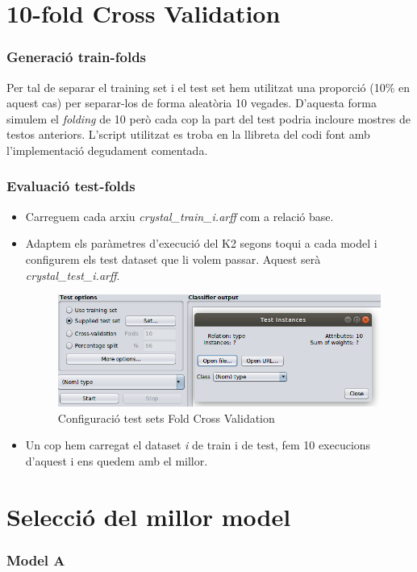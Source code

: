 \documentclass[11pt,a4paper]{article}
\begin{document}
\newpage

\part{10-fold Cross Validation}
\section{Generació train-folds}
Per tal de separar el training set i el test set hem utilitzat una proporció (10\% en aquest cas) per separar-los de forma aleatòria 10 vegades. D'aquesta forma simulem el \textit{folding} de 10 però cada cop la part del test podria incloure mostres de testos anteriors. L'script utilitzat es troba en la llibreta del codi font amb l'implementació degudament comentada.

\section{Evaluació test-folds}
\begin{itemize}
\item Carreguem cada arxiu \textit{crystal\_train\_i.arff} com a relació base.
\item Adaptem els paràmetres d'execució del K2 segons toqui a cada model i configurem els test dataset que li volem passar. Aquest serà \textit{crystal\_test\_i.arff}. 
\begin{figure}[hbtp]
\centering
\includegraphics[scale=0.6]{Figures/8.png}
\caption{Configuració test sets Fold Cross Validation}
\end{figure}
\item Un cop hem carregat el dataset \textit{i} de train i de test, fem 10 execucions d'aquest i ens quedem amb el millor.
\end{itemize}
\newpage

\part{Selecció del millor model}
\section{Model A}
\vspace*{0.5in}
\end{document}
